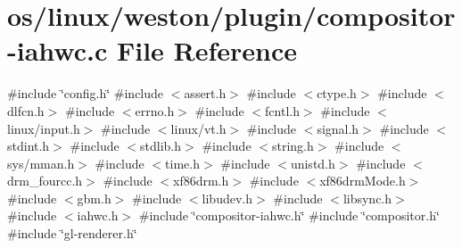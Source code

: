 \hypertarget{compositor-iahwc_8c}{}\section{os/linux/weston/plugin/compositor-\/iahwc.\+c File Reference}
\label{compositor-iahwc_8c}
{\ttfamily \#include \char`\"{}config.\+h\char`\"{}}\newline
{\ttfamily \#include $<$assert.\+h$>$}\newline
{\ttfamily \#include $<$ctype.\+h$>$}\newline
{\ttfamily \#include $<$dlfcn.\+h$>$}\newline
{\ttfamily \#include $<$errno.\+h$>$}\newline
{\ttfamily \#include $<$fcntl.\+h$>$}\newline
{\ttfamily \#include $<$linux/input.\+h$>$}\newline
{\ttfamily \#include $<$linux/vt.\+h$>$}\newline
{\ttfamily \#include $<$signal.\+h$>$}\newline
{\ttfamily \#include $<$stdint.\+h$>$}\newline
{\ttfamily \#include $<$stdlib.\+h$>$}\newline
{\ttfamily \#include $<$string.\+h$>$}\newline
{\ttfamily \#include $<$sys/mman.\+h$>$}\newline
{\ttfamily \#include $<$time.\+h$>$}\newline
{\ttfamily \#include $<$unistd.\+h$>$}\newline
{\ttfamily \#include $<$drm\+\_\+fourcc.\+h$>$}\newline
{\ttfamily \#include $<$xf86drm.\+h$>$}\newline
{\ttfamily \#include $<$xf86drm\+Mode.\+h$>$}\newline
{\ttfamily \#include $<$gbm.\+h$>$}\newline
{\ttfamily \#include $<$libudev.\+h$>$}\newline
{\ttfamily \#include $<$libsync.\+h$>$}\newline
{\ttfamily \#include $<$iahwc.\+h$>$}\newline
{\ttfamily \#include \char`\"{}compositor-\/iahwc.\+h\char`\"{}}\newline
{\ttfamily \#include \char`\"{}compositor.\+h\char`\"{}}\newline
{\ttfamily \#include \char`\"{}gl-\/renderer.\+h\char`\"{}}\newline
